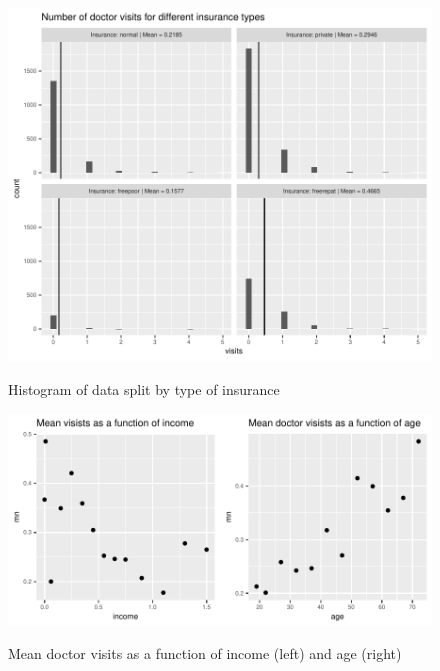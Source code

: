 \documentclass[a4paper,11pt]{article}
\begin{document}
\begin{figure}[h]
	\centering
\includegraphics{../plots/histograms_of_insurances.pdf}
	\label{fig:hist_insurances}
		\caption{Histogram of data split by type of insurance}
\end{figure}

\begin{figure}[h]
	\centering
\includegraphics{../plots/mean_vs_income_and_age.pdf}
	\label{fig:scatter_income_and_age}
			\caption{Mean doctor visits as a function of income (left) and age (right)}
\end{figure}
\end{document}
